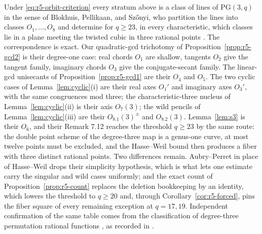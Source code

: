 \begin{remark}
Under \eqref{eq:r5-orbit-criterion} every stratum above is a class of
lines of $\mathrm{PG}(3,q)$ in the sense of Blokhuis, Pellikaan, and
Sz\H onyi, who partition the lines into classes $O_1,\ldots,O_8$ and
determine for $q\geq23$, in every characteristic, which classes lie in
a plane meeting the twisted cubic in three rational points
\cite[Thm.~8.1 and Prop.~8.4]{BPS2022}.  The correspondence is exact.
Our quadratic-gcd trichotomy of Proposition~\ref{prop:r5-gcd2} is their
degree-one case: real chords $O_1$ are shallow, tangents $O_2$ give the
tangent family, imaginary chords $O_3$ give the conjugate-secant
family.  The linear-gcd unisecants of
Proposition~\ref{prop:r5-gcd1} are their $O_4$ and $O_5$.  The two
cyclic cases of Lemma~\ref{lem:cyclic}(i) are their real axes $O_1'$
and imaginary axes $O_3'$, with the same congruences mod three; the
characteristic-three nucleus of Lemma~\ref{lem:cyclic}(ii) is their
axis $O_7(3)$; the wild pencils of Lemma~\ref{lem:cyclic}(iii) are
their $O_{8.1}(3)^{\pm}$ and $O_{8.2}(3)$.  Lemma~\ref{lem:s3} is their
$O_6$, and their Remark 7.12 reaches the threshold $q\geq23$ by the
same route: the double point scheme of the degree-three map is a
genus-one curve, at most twelve points must be excluded, and the
Hasse--Weil bound then produces a fiber with three distinct rational
points.  Two differences remain.  Aubry--Perret in place of
Hasse--Weil drops their simplicity hypothesis, which is what lets one
estimate carry the singular and wild cases uniformly; and the exact
count of Proposition~\ref{prop:r5-count} replaces the deletion
bookkeeping by an identity, which lowers the threshold to $q\geq20$
and, through Corollary~\ref{cor:r5-forced}, pins the fiber square of
every remaining exception at $q=17,19$.  Independent confirmation of the same table comes from the
classification of degree-three permutation rational functions
\cite{FerragutiMicheli2020}, as recorded in \cite[Rem.~8.6]{BPS2022}.


\end{remark}
